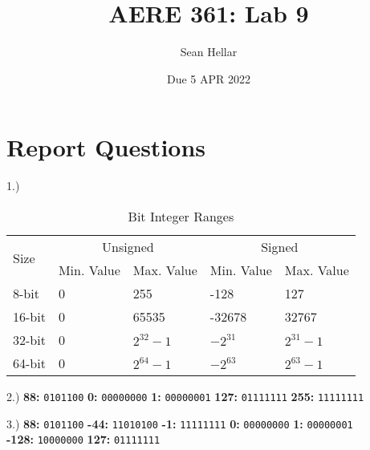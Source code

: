 \documentclass{article}
\title{AERE 361: Lab 9}
\date{Due 5 APR 2022}
\author{Sean Hellar}
\begin{document}
\maketitle
\newpage

\section{Report Questions}

1.) 


\begin{table}[H]
  \caption{Bit Integer Ranges}
  \label{my-label}
  \begin{tabular}{lllll}
    \multirow{2}{*}{Size} & \multicolumn{2}{c}{Unsigned} & \multicolumn{2}{c}{Signed} \\
                          & Min. Value    & Max. Value   & Min. Value   & Max. Value  \\
    8-bit                 &0              &255           &-128          &127          \\
    16-bit                &0              & 65535        &-32678        &32767         \\
    32-bit                &0              & $2^{32}-1$   &$-2^{31}$      &$2^{31}-1$      \\
    64-bit                &0              & $2^{64}-1$   &$-2^{63}$      &$2^{63}-1$
  \end{tabular}
\end{table}



2.)
\textbf{88:} \texttt{0101100} 
\textbf{0:} \texttt{00000000}
\textbf{1:} \texttt{00000001}
\textbf{127:} \texttt{01111111}
\textbf{255:} \texttt{11111111}

3.)
\textbf{88:} \texttt{0101100}
\textbf{-44:} \texttt{11010100}
\textbf{-1:} \texttt{11111111}
\textbf{0:} \texttt{00000000}
\textbf{1:} \texttt{00000001} \\
\textbf{-128:} \texttt{10000000}
\textbf{127:} \texttt{01111111}
\end{document}
